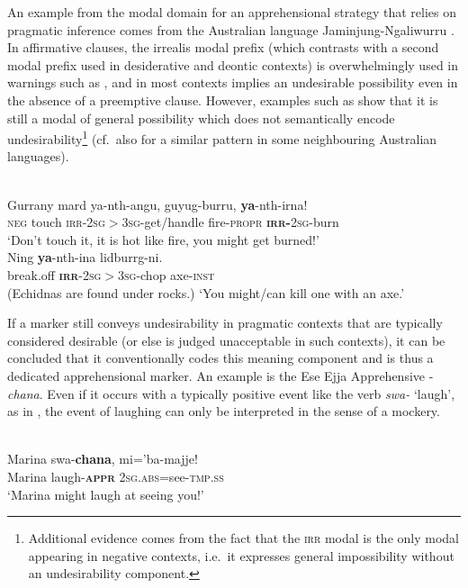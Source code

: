 \documentclass[output=paper,colorlinks,citecolor=brown
]{langscibook}
\begin{document}
 An example from the modal domain for an apprehensional strategy that relies on pragmatic inference comes from the Australian language Jaminjung-Ngaliwurru \citep{schultzeberndtcaudal2019}. In affirmative clauses, the irrealis modal prefix (which contrasts with a second modal prefix used in desiderative and deontic contexts) is overwhelmingly used in warnings such as , and in most contexts implies an undesirable possibility even in the absence of a preemptive clause. However, examples such as  show that it is still a modal of general possibility which does not semantically encode undesirability\footnote{Additional evidence comes from the fact that the \textsc{irr} modal is the only modal appearing in negative contexts, i.e.\ it expresses general impossibility without an undesirability component.} (cf.\ also \citet{chapters/browne} for a similar pattern in some neighbouring Australian languages).

\ea 
\label{ex:intro15} 
\\
\ea \label{ex:intro15a}
\gll Gurrany mard ya-nth-angu, guyug-burru, \textbf{ya}-nth-irna! \\
\textsc{neg} touch \textsc{irr-2sg$>$3sg-}get/handle fire-\textsc{propr} \textsc{\textbf{irr-}2sg-}burn \\
\glt `Don't touch it, it is hot like fire, you might get burned!' \\
\ex \label{ex:intro15b}
\gll Ning \textbf{ya}-nth-ina lidburrg-ni. \\
break.off \textsc{\textbf{irr}-2sg$>$3sg-}chop axe-\textsc{inst} \\
\glt (Echidnas are found under rocks.) `You might/can kill one with an axe.'
\z
\z

If a marker still conveys undesirability in pragmatic contexts that are typically considered desirable (or else is judged unacceptable in such contexts), it can be concluded that it conventionally codes this meaning component and is thus a dedicated apprehensional marker. An example is the Ese Ejja Apprehensive \nobreakdash-\textit{chana}. Even if it occurs with a typically positive event like the verb \textit{swa-} `laugh', as in , the event of laughing can only be interpreted in the sense of a mockery.


\ea 
\label{ex:intro16}
 \\
\gll Marina swa-\textbf{chana}, mi='ba-majje! \\
Marina laugh-\textsc{\textbf{appr}} \textsc{2sg.abs=}see-\textsc{tmp.ss} \\
\glt `Marina might laugh at seeing you!'
\z
\end{document}
